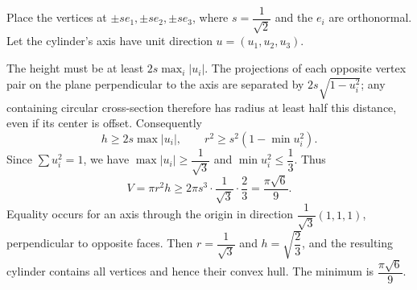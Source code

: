 Place the vertices at $\pm se_1,\pm se_2,\pm se_3$, where $s=\dfrac{1}{\sqrt2}$ and the $e_i$ are orthonormal. Let the cylinder's axis have unit direction $u=(u_1,u_2,u_3)$.

The height must be at least $2s\max_i|u_i|$. The projections of each opposite vertex pair on the plane perpendicular to the axis are separated by $2s\sqrt{1-u_i^2}$; any containing circular cross-section therefore has radius at least half this distance, even if its center is offset. Consequently
\[
h\ge2s\max|u_i|,\qquad r^2\ge s^2(1-\min u_i^2).
\]
Since $\sum u_i^2=1$, we have $\max|u_i|\ge\dfrac{1}{\sqrt3}$ and $\min u_i^2\le\dfrac{1}{3}$. Thus
\[
V=\pi r^2h\ge2\pi s^3\cdot\dfrac{1}{\sqrt3}\cdot\dfrac{2}{3}
=\dfrac{\pi\sqrt6}{9}.
\]
Equality occurs for an axis through the origin in direction $\dfrac{1}{\sqrt3}(1,1,1)$, perpendicular to opposite faces. Then $r=\dfrac{1}{\sqrt3}$ and $h=\sqrt{\dfrac{2}{3}}$, and the resulting cylinder contains all vertices and hence their convex hull. The minimum is $\boxed{\dfrac{\pi\sqrt6}{9}}$.
